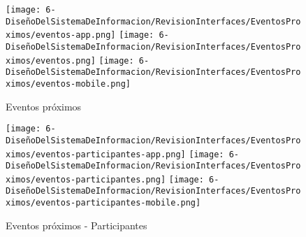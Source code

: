 \begin{figure}[H]
	\centering
	\texttt{[image: 6-DiseñoDelSistemaDeInformacion/RevisionInterfaces/EventosProximos/eventos-app.png]}
	\texttt{[image: 6-DiseñoDelSistemaDeInformacion/RevisionInterfaces/EventosProximos/eventos.png]}
	\texttt{[image: 6-DiseñoDelSistemaDeInformacion/RevisionInterfaces/EventosProximos/eventos-mobile.png]}
	\caption{Eventos próximos}
\end{figure}

\begin{figure}[H]
	\centering
	\texttt{[image: 6-DiseñoDelSistemaDeInformacion/RevisionInterfaces/EventosProximos/eventos-participantes-app.png]}
	\texttt{[image: 6-DiseñoDelSistemaDeInformacion/RevisionInterfaces/EventosProximos/eventos-participantes.png]}
	\texttt{[image: 6-DiseñoDelSistemaDeInformacion/RevisionInterfaces/EventosProximos/eventos-participantes-mobile.png]}
	\caption{Eventos próximos - Participantes}
\end{figure}
